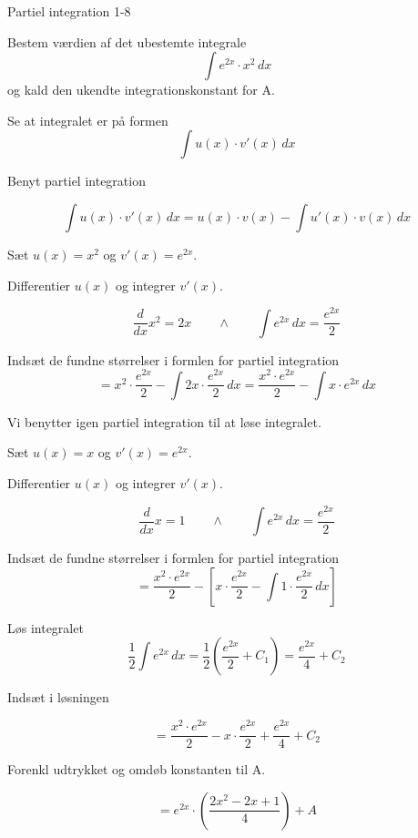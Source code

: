 \documentclass{article}
\begin{document}
\begin{exercise}{Partiel integration 1-8}


Bestem værdien af det ubestemte integrale
\[
\int e^{2x} \cdot x^2 \, dx
\]
og kald den ukendte integrationskonstant for A.



\hint

Se at integralet er på formen
\[
\int u(x) \cdot v'(x) \, dx
\]

\hint

Benyt partiel integration

\hint
\[
\int u(x) \cdot v'(x)\, dx = u(x) \cdot v(x) - \int u'(x) \cdot v(x) \, dx
\]
\hint

Sæt $u(x) = x^2$ og $v'(x) = e^{2x}$.


\hint

Differentier $u(x)$ og integrer $v'(x)$.

\hint
\[
\frac{d}{dx}x^2 = 2x \qquad \wedge \qquad \int e^{2x} \, dx = \frac{e^{2x}}{2}
\]

\hint

Indsæt de fundne størrelser i formlen for partiel integration
\[
= x^2 \cdot \frac{e^{2x}}{2} - \int 2x \cdot \frac{e^{2x}}{2} \, dx = \frac{x^2 \cdot e^{2x}}{2} - \int x \cdot e^{2x} \, dx
\]

\hint

Vi benytter igen partiel integration til at løse integralet.

\hint

Sæt $u(x) = x$ og $v'(x) = e^{2x}$.


\hint

Differentier $u(x)$ og integrer $v'(x)$.

\hint
\[
\frac{d}{dx}x = 1 \qquad \wedge \qquad \int e^{2x} \, dx = \frac{e^{2x}}{2}
\]

\hint

Indsæt de fundne størrelser i formlen for partiel integration
\[
= \frac{x^2 \cdot e^{2x}}{2} - \left[ x \cdot \frac{e^{2x}}{2} - \int 1 \cdot \frac{e^{2x}}{2} \, dx \right]
\]

\hint
Løs integralet
\[
\frac{1}{2} \int e^{2x} \, dx = \frac{1}{2} \left(\frac{e^{2x}}{2} + C_1\right) = \frac{e^{2x}}{4} + C_2
\]

\hint
Indsæt i løsningen

\hint

\[
= \frac{x^2 \cdot e^{2x}}{2} -x \cdot \frac{e^{2x}}{2} + \frac{e^{2x}}{4} + C_2
\]

\hint

Forenkl udtrykket og omdøb konstanten til A.

\hint

\[
= e^{2x} \cdot \left( \frac{2x^2 - 2x + 1}{4} \right) + A
\]


\end{exercise}
\end{document}
